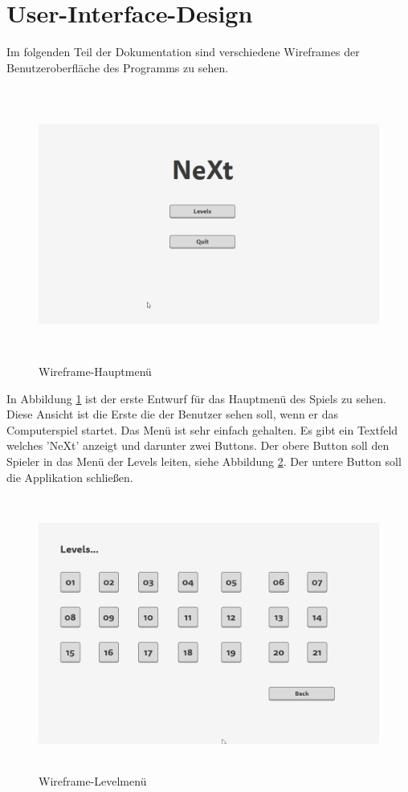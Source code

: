 \section{User-Interface-Design}
Im folgenden Teil der Dokumentation sind verschiedene Wireframes der Benutzeroberfläche des Programms zu sehen.
\begin{figure}[H]
	\centering
	\includegraphics[width=16cm, height=9cm]{images/WireframeMainmenu.png}
	\caption{Wireframe-Hauptmenü}
	\label{WireframeMainmenu}
\end{figure}
In Abbildung \ref{WireframeMainmenu} ist der erste Entwurf für das Hauptmenü des Spiels zu sehen. Diese Ansicht ist die Erste die der Benutzer sehen soll, wenn er das Computerspiel startet. Das Menü ist sehr einfach gehalten. Es gibt ein Textfeld welches 'NeXt' anzeigt und darunter zwei Buttons. Der obere Button soll  den Spieler in das Menü der Levels leiten, siehe Abbildung \ref{WireframeLevelsmenu}. Der untere Button soll  die Applikation schließen.
\begin{figure}[H]
	\centering
	\includegraphics[width=16cm, height=9cm]{images/WireframeLevelsmenu.png}
	\caption{Wireframe-Levelmenü}
	\label{WireframeLevelsmenu}
\end{figure}

